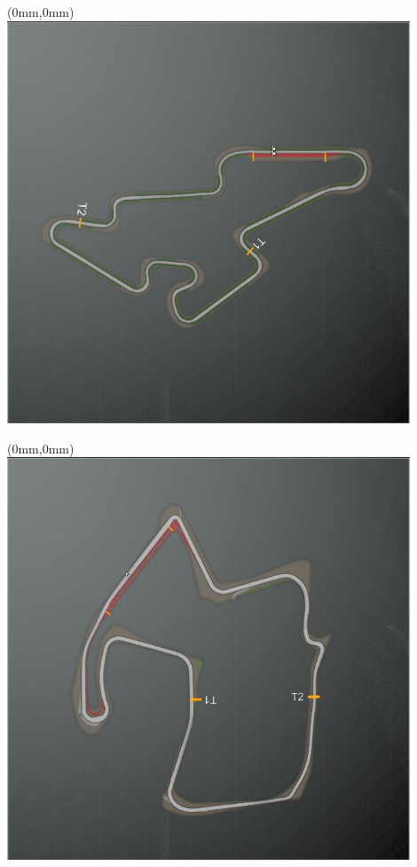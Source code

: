 \null\newpage
\begin{textblock*}{30mm}(0mm,0mm)%
\includegraphics[width=120mm]{TR/2015-05-20_00009.png}
\end{textblock*}
\null\newpage
\begin{textblock*}{30mm}(0mm,0mm)%
\includegraphics[width=120mm]{TR/2015-05-21_00001.png}
\end{textblock*}
